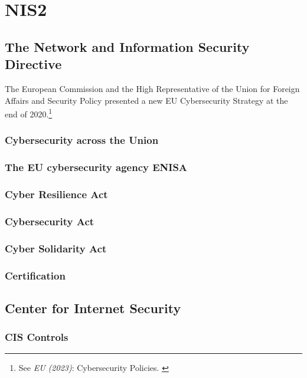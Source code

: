 %
%

\pagebreak
\section{NIS2}

\onehalfspacing

\subsection{The Network and Information Security Directive}

The European Commission and the High Representative of the Union for Foreign Affairs and Security Policy presented a new EU Cybersecurity Strategy at the end of 2020.\footnote{See \textit{EU (2023)}: Cybersecurity Policies. \cite{cyberPol}}

\subsubsection{Cybersecurity across the Union}

\subsubsection{The EU cybersecurity agency ENISA}

\subsubsection{Cyber Resilience Act}

\subsubsection{Cybersecurity Act}

\subsubsection{Cyber Solidarity Act}

\subsubsection{Certification}

\subsection{Center for Internet Security}

\subsubsection{CIS Controls}

